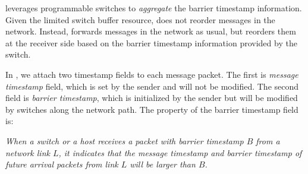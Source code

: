 

 
\sys leverages programmable switches to \emph{aggregate} the barrier timestamp information. Given the limited switch buffer resource, \sys does not reorder messages in the network. Instead, \sys forwards messages in the network as usual, but reorders them at the receiver side based on the barrier timestamp information provided by the switch.

In \sys, we attach two timestamp fields to each message packet. The first is \textit{message timestamp} field, which is set by the sender and will not be modified. The second field is \textit{barrier timestamp}, which is initialized by the sender but will be modified by switches along the network path. The property of the barrier timestamp field is:

\emph{When a switch or a host receives a packet with barrier timestamp $B$ from a network link $L$, it indicates that the message timestamp and barrier timestamp of future arrival packets from link $L$ will be larger than $B$.}

